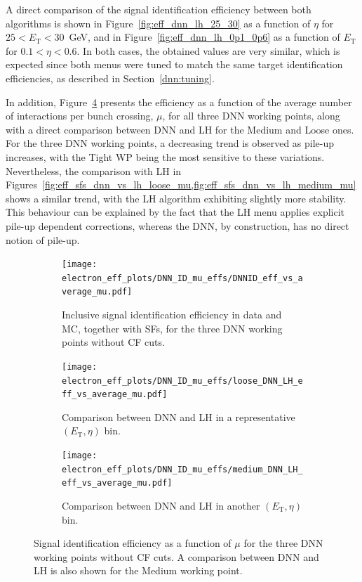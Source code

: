A direct comparison of the signal identification efficiency between both algorithms is shown in Figure~\ref{fig:eff_dnn_lh_25_30} as a function of $\eta$ for $25 < E_{\mathrm{T}} < 30$~GeV, and in Figure~\ref{fig:eff_dnn_lh_0p1_0p6} as a function of $E_{\mathrm{T}}$ for $0.1 < \eta < 0.6$. In both cases, the obtained values are very similar, which is expected since both menus were tuned to match the same target identification efficiencies, as described in Section~\ref{dnn:tuning}.

In addition, Figure~\ref{fig:eff_sfs_dnn_vs_lh_mu} presents the efficiency as a function of the average number of interactions per bunch crossing, $\mu$, for all three DNN working points, along with a direct comparison between DNN and LH for the Medium and Loose ones. For the three DNN working points, a decreasing trend is observed as pile-up increases, with the Tight WP being the most sensitive to these variations. Nevertheless, the comparison with LH in Figures~\ref{fig:eff_sfs_dnn_vs_lh_loose_mu,fig:eff_sfs_dnn_vs_lh_medium_mu} shows a similar trend, with the LH algorithm exhibiting slightly more stability. This behaviour can be explained by the fact that the LH menu applies explicit pile-up dependent corrections, whereas the DNN, by construction, has no direct notion of pile-up.

\begin{figure}[htbp]
  \centering
  \begin{subfigure}{0.70\textwidth}
    \centering
    \texttt{[image: electron\_eff\_plots/DNN\_ID\_mu\_effs/DNNID\_eff\_vs\_average\_mu.pdf]}
    \caption{Inclusive signal identification efficiency in data and MC, together with SFs, for the three DNN working points without CF cuts.}
    \label{fig:eff_sfs_dnn_mu}
  \end{subfigure}

  \vspace{0.6cm}

  \begin{subfigure}{0.48\textwidth}
    \centering
    \texttt{[image: electron\_eff\_plots/DNN\_ID\_mu\_effs/loose\_DNN\_LH\_eff\_vs\_average\_mu.pdf]}
    \caption{Comparison between DNN and LH in a representative $(E_{\mathrm{T}},\eta)$ bin.}
    \label{fig:eff_sfs_dnn_vs_lh_loose_mu}
  \end{subfigure}
  \hfill
  \begin{subfigure}{0.48\textwidth}
    \centering
    \texttt{[image: electron\_eff\_plots/DNN\_ID\_mu\_effs/medium\_DNN\_LH\_eff\_vs\_average\_mu.pdf]}
    \caption{Comparison between DNN and LH in another $(E_{\mathrm{T}},\eta)$ bin.}
    \label{fig:eff_sfs_dnn_vs_lh_medium_mu}
  \end{subfigure}

  \caption{Signal identification efficiency as a function of $\mu$ for the three DNN working points without CF cuts. A comparison between DNN and LH is also shown for the Medium working point.}
  \label{fig:eff_sfs_dnn_vs_lh_mu}
\end{figure}


